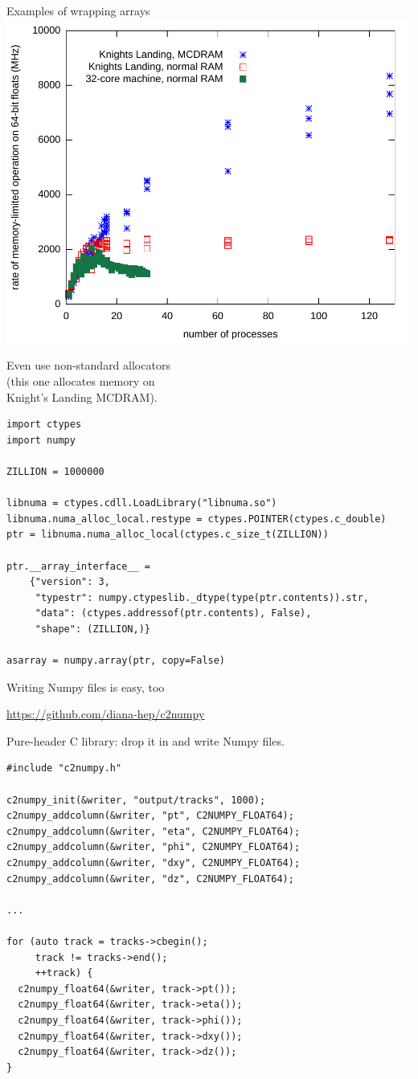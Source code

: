\documentclass{beamer}
\begin{document}
\begin{frame}[fragile]{Examples of wrapping arrays}
\vspace{0.5 cm}
\hfill \includegraphics[height=3.5 cm]{knl-scaling.pdf}

\vspace{-3.5 cm}
Even use non-standard allocators \\ (this one allocates memory on \\ Knight's Landing MCDRAM).

\vspace{0.25 cm}
\scriptsize
\begin{verbatim}
import ctypes
import numpy

ZILLION = 1000000

libnuma = ctypes.cdll.LoadLibrary("libnuma.so")
libnuma.numa_alloc_local.restype = ctypes.POINTER(ctypes.c_double)
ptr = libnuma.numa_alloc_local(ctypes.c_size_t(ZILLION))

ptr.__array_interface__ =
    {"version": 3,
     "typestr": numpy.ctypeslib._dtype(type(ptr.contents)).str,
     "data": (ctypes.addressof(ptr.contents), False),
     "shape": (ZILLION,)}

asarray = numpy.array(ptr, copy=False)
\end{verbatim}
\end{frame}

\begin{frame}[fragile]{Writing Numpy files is easy, too}
\begin{center}
\textcolor{blue}{\underline{\url{https://github.com/diana-hep/c2numpy}}}
\end{center}

Pure-header C library: drop it in and write Numpy files.

\vspace{0.25 cm}
\scriptsize
\begin{verbatim}
#include "c2numpy.h"

c2numpy_init(&writer, "output/tracks", 1000);
c2numpy_addcolumn(&writer, "pt", C2NUMPY_FLOAT64);
c2numpy_addcolumn(&writer, "eta", C2NUMPY_FLOAT64);
c2numpy_addcolumn(&writer, "phi", C2NUMPY_FLOAT64);
c2numpy_addcolumn(&writer, "dxy", C2NUMPY_FLOAT64);
c2numpy_addcolumn(&writer, "dz", C2NUMPY_FLOAT64);

...

for (auto track = tracks->cbegin();
     track != tracks->end();
     ++track) {
  c2numpy_float64(&writer, track->pt());
  c2numpy_float64(&writer, track->eta());
  c2numpy_float64(&writer, track->phi());
  c2numpy_float64(&writer, track->dxy());
  c2numpy_float64(&writer, track->dz());
}
\end{verbatim}
\end{frame}
\end{document}
